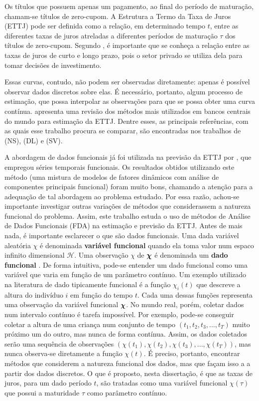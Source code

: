 \documentclass[
	12pt,				%
	openright,			%
	oneside,			%
	a4paper,			%
	english,			%
	brazil				%
	]{dissertacao-ufrgs-abntex2}
\begin{document}
Os títulos que possuem apenas um pagamento, ao final do período de
maturação, chamam-se títulos de zero-cupom. A Estrutura a Termo da
Taxa de Juros (ETTJ) pode ser definida como a relação, em determinado tempo $t$, entre as diferentes taxas de juros atreladas
a diferentes períodos de maturação $\tau$ dos títulos de zero-cupom.
Segundo , é importante que se conheça a relação
entre as taxas de juros de curto e longo prazo, pois o setor privado
se utiliza dela para tomar decisões de investimento.

Essas curvas, contudo, não podem ser observadas diretamente: apenas é possível observar dados discretos sobre elas. É necessário, portanto, algum
processo de estimação, que possa interpolar as observações para que
se possa obter uma curva contínua.   apresenta
uma revisão dos métodos mais utilizados em bancos centrais do mundo
para estimação da ETTJ. Dentre esses, as principais referências, com
as quais esse trabalho procura se comparar, são encontradas nos trabalhos 
de (NS), 
(DL) e (SV).


A abordagem de dados funcionais já foi utilizada na previsão da ETTJ por , que empregou séries temporais funcionais. Os resultados obtidos utilizando este método (uma mistura de modelos de fatores dinâmicos com análise de componentes principais funcional) foram muito bons, chamando a atenção para a adequação de tal abordagem ao problema estudado. Por essa razão, achou-se importante investigar outras variações de métodos que considerassem a natureza funcional do problema. 
Assim, este trabalho estuda o uso de métodos de Análise de Dados Funcionais (FDA) na estimação e previsão da ETTJ. Antes de mais nada, é importante esclarecer o que são dados funcionais.
Uma dada variável aleatória $\chi$ é denominada \textbf{variável
funcional }quando ela toma valor num espaco infinito dimensional $\mathcal{H}$.
Uma observação $\chi$ de $\mathcal{\boldsymbol{\chi}}$ é denominada um \textbf{dado
funcional} \cite{vieu_nonparametric_2006}.
De forma intuitiva, pode-se entender um dado funcional como uma variável
que varia em função de um parâmetro contínuo. Um exemplo utilizado
na literatura de dado tipicamente funcional é a função $\chi_{i}(t)$
que descreve a altura do indivíduo $i$ em função do tempo $t$. Cada
uma dessas funções representa uma observação da variável funcional
$\boldsymbol{\chi}$. 
No mundo real, porém, coletar dados num intervalo contínuo é tarefa
impossível. Por exemplo, pode-se conseguir coletar a altura de uma
criança num conjunto de tempo $(t_{1},t_{2},t_{3},...,t_{T})$ muito
próximo um do outro, mas nunca de forma contínua. Assim, os dados coletados serão 
uma sequência de observações $(\chi(t_{1}),\chi(t_{2}),\chi(t_{3}),...,\chi(t_{T}))$,
mas nunca observa-se diretamente a função $\chi(t)$. É preciso, portanto, encontrar
métodos que considerem a natureza funcional dos dados, mas que façam isso a a partir dos dados discretos.
O que é proposto, nesta dissertação, é que as taxas de juros, para um dado período $t$, são tratadas como uma variável funcional $\chi(\tau)$ que possui a maturidade $\tau$ como parâmetro contínuo.
\end{document}
